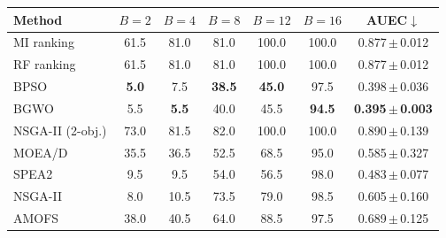 \begin{tabular}{lcccccc}
\toprule
Method & $B=2$ & $B=4$ & $B=8$ & $B=12$ & $B=16$ & AUEC$\downarrow$ \\
\midrule
MI ranking & 61.5 & 81.0 & 81.0 & 100.0 & 100.0 & 0.877\,$\pm$\,0.012 \\
RF ranking & 61.5 & 81.0 & 81.0 & 100.0 & 100.0 & 0.877\,$\pm$\,0.012 \\
BPSO & \textbf{5.0} & 7.5 & \textbf{38.5} & \textbf{45.0} & 97.5 & 0.398\,$\pm$\,0.036 \\
BGWO & 5.5 & \textbf{5.5} & 40.0 & 45.5 & \textbf{94.5} & \textbf{0.395\,$\pm$\,0.003} \\
NSGA-II (2-obj.) & 73.0 & 81.5 & 82.0 & 100.0 & 100.0 & 0.890\,$\pm$\,0.139 \\
MOEA/D & 35.5 & 36.5 & 52.5 & 68.5 & 95.0 & 0.585\,$\pm$\,0.327 \\
SPEA2 & 9.5 & 9.5 & 54.0 & 56.5 & 98.0 & 0.483\,$\pm$\,0.077 \\
NSGA-II & 8.0 & 10.5 & 73.5 & 79.0 & 98.5 & 0.605\,$\pm$\,0.160 \\
AMOFS & 38.0 & 40.5 & 64.0 & 88.5 & 97.5 & 0.689\,$\pm$\,0.125 \\
\bottomrule
\end{tabular}
